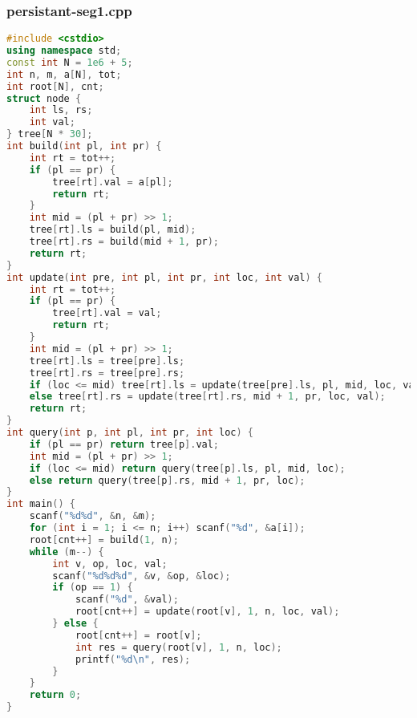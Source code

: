 \documentclass[9pt, a4paper, oneside]{book}
\begin{document}
\subsubsection{persistant-seg1.cpp}
\begin{lstlisting}[language={C++}]
#include <cstdio>
using namespace std;
const int N = 1e6 + 5;
int n, m, a[N], tot;
int root[N], cnt;
struct node {
    int ls, rs;
    int val;
} tree[N * 30];
int build(int pl, int pr) {
    int rt = tot++;
    if (pl == pr) {
        tree[rt].val = a[pl];
        return rt;
    }
    int mid = (pl + pr) >> 1;
    tree[rt].ls = build(pl, mid);
    tree[rt].rs = build(mid + 1, pr);
    return rt;
}
int update(int pre, int pl, int pr, int loc, int val) {
    int rt = tot++;
    if (pl == pr) {
        tree[rt].val = val;
        return rt;
    }
    int mid = (pl + pr) >> 1;
    tree[rt].ls = tree[pre].ls;
    tree[rt].rs = tree[pre].rs;
    if (loc <= mid) tree[rt].ls = update(tree[pre].ls, pl, mid, loc, val);
    else tree[rt].rs = update(tree[rt].rs, mid + 1, pr, loc, val);
    return rt;
}
int query(int p, int pl, int pr, int loc) {
    if (pl == pr) return tree[p].val;
    int mid = (pl + pr) >> 1;
    if (loc <= mid) return query(tree[p].ls, pl, mid, loc);
    else return query(tree[p].rs, mid + 1, pr, loc);
}
int main() {
    scanf("%d%d", &n, &m);
    for (int i = 1; i <= n; i++) scanf("%d", &a[i]);
    root[cnt++] = build(1, n);
    while (m--) {
        int v, op, loc, val;
        scanf("%d%d%d", &v, &op, &loc);
        if (op == 1) {
            scanf("%d", &val);
            root[cnt++] = update(root[v], 1, n, loc, val);
        } else {
            root[cnt++] = root[v];
            int res = query(root[v], 1, n, loc);
            printf("%d\n", res);
        }
    }
    return 0;
}\end{lstlisting}
\end{document}
